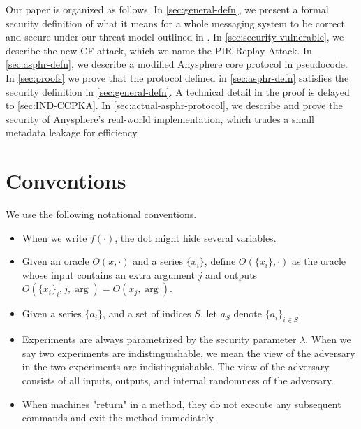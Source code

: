 Our paper is organized as follows. In \cref{sec:general-defn}, we present a formal security definition of what it means for a whole messaging system to be correct and secure under our threat model outlined in \cite{whitepaper}. In \cref{sec:security-vulnerable}, we describe the new CF attack, which we name the PIR Replay Attack. In \cref{sec:asphr-defn}, we describe a modified Anysphere core protocol in pseudocode. In \cref{sec:proofs} we prove that the protocol defined in \cref{sec:asphr-defn} satisfies the security definition in \cref{sec:general-defn}. A technical detail in the proof is delayed to \cref{sec:IND-CCPKA}. In \cref{sec:actual-asphr-protocol}, we describe and prove the security of Anysphere's real-world implementation, which trades a small metadata leakage for efficiency.



\section{Conventions}
We use the following notational conventions.
\begin{itemize}
    \item When we write $f(\cdot)$, the dot might hide several variables.
    
    \item Given an oracle $O(x, \cdot)$ and a series $\{x_i\}$, define $O(\{x_i\}, \cdot)$ as the oracle whose input contains an extra argument $j$ and outputs $O(\{x_i\}_i, j, \arg) = O(x_j, \arg)$.

    \item Given a series $\{a_i\}$, and a set of indices $S$, let $a_S$ denote $\{a_i\}_{i \in S}$. 

    \item Experiments are always parametrized by the security parameter $\lambda$. When we say two experiments are indistinguishable, we mean the view of the adversary in the two experiments are indistinguishable. The view of the adversary consists of all inputs, outputs, and internal randomness of the adversary.
    
    \item When machines "return" in a method, they do not execute any subsequent commands and exit the method immediately.
\end{itemize}
